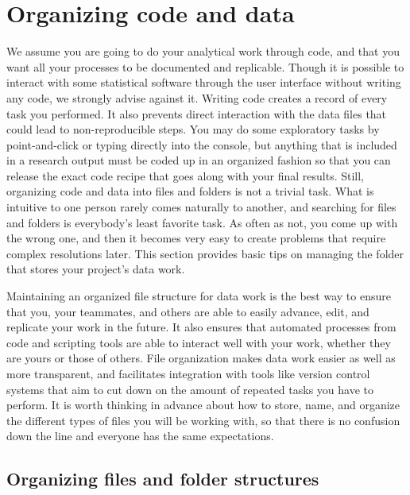 \section{Organizing code and data}

We assume you are going to do your analytical work through code,
and that you want all your processes to be documented and replicable.
Though it is possible to interact with some statistical software
through the user interface without writing any code,
we strongly advise against it.
Writing code creates a record of every task you performed.
It also prevents direct interaction with the data files that could lead to non-reproducible steps.
You may do some exploratory tasks by point-and-click or typing directly into the console,
but anything that is included in a research output
must be coded up in an organized fashion so that you can release
the exact code recipe that goes along with your final results.
Still, organizing code and data into files and folders is not a trivial task.
What is intuitive to one person rarely comes naturally to another,
and searching for files and folders is everybody's least favorite task.
As often as not, you come up with the wrong one,
and then it becomes very easy to create problems that require complex resolutions later.
This section provides basic tips on managing the folder
that stores your project's data work.

Maintaining an organized file structure for data work is the best way
to ensure that you, your teammates, and others
are able to easily advance, edit, and replicate your work in the future.
It also ensures that automated processes from code and scripting tools
are able to interact well with your work,
whether they are yours or those of others.
File organization makes data work easier as well as more transparent,
and facilitates integration with tools like version control systems
that aim to cut down on the amount of repeated tasks you have to perform.
It is worth thinking in advance about how to store, name, and organize
the different types of files you will be working with,
so that there is no confusion down the line
and everyone has the same expectations.

\subsection{Organizing files and folder structures}

